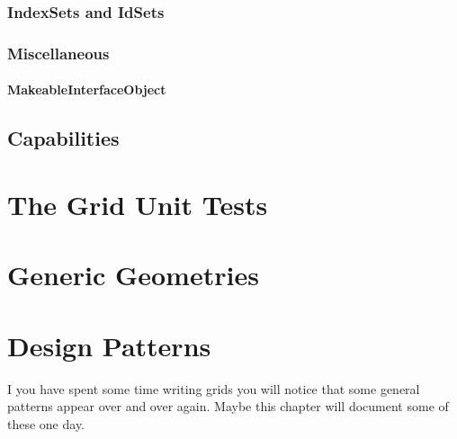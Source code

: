 \documentclass[11pt,a4paper,headinclude,footinclude,DIV16,normalheadings]{scrreprt}
\begin{document}
\subsection{IndexSets and IdSets}

\subsection{Miscellaneous}

\subsubsection{MakeableInterfaceObject}

\section{Capabilities}

\chapter{The Grid Unit Tests}

\chapter{Generic Geometries}

\chapter{Design Patterns}

I you have spent some time writing \dune grids you will notice that
some general patterns appear over and over again.  Maybe this chapter
will document some of these one day.




\printindex
\end{document}
